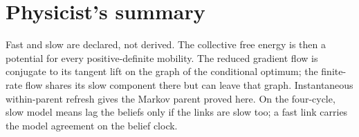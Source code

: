 \section*{Physicist's summary}

Fast and slow are declared, not derived. The collective free energy is then a
potential for every positive-definite mobility. The reduced gradient flow is
conjugate to its tangent lift on the graph of the conditional optimum; the
finite-rate flow shares its slow component there but can leave that graph.
Instantaneous within-parent refresh gives the Markov parent proved here.
On the four-cycle, slow model means lag the beliefs only if the links
are slow too; a fast link carries the model agreement on the belief clock.
